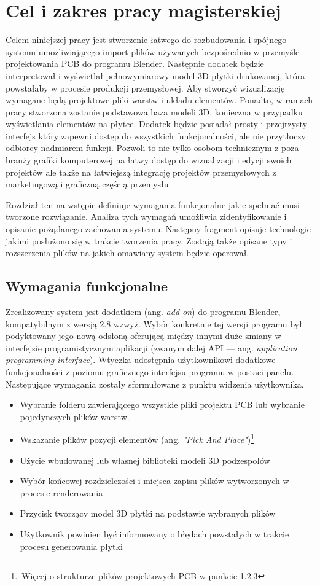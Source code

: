 \documentclass{xmgr}
\begin{document}
\chapter{Cel i zakres pracy magisterskiej}

Celem niniejszej pracy jest stworzenie łatwego do rozbudowania i spójnego systemu umożliwiającego import plików używanych bezpośrednio w przemyśle projektowania PCB do programu Blender. Następnie dodatek będzie interpretował i wyświetlał pełnowymiarowy model 3D płytki drukowanej, która powstałaby w procesie produkcji przemysłowej. Aby stworzyć wizualizację wymagane będą projektowe pliki warstw i układu elementów. Ponadto, w ramach pracy stworzona zostanie podstawowa baza modeli 3D, konieczna w przypadku wyświetlania elementów na płytce. Dodatek będzie posiadał prosty i przejrzysty interfejs który zapewni dostęp do wszystkich funkcjonalności, ale nie przytłoczy odbiorcy nadmiarem funkcji. Pozwoli to nie tylko osobom technicznym z poza branży grafiki komputerowej na łatwy dostęp do wizualizacji i edycji swoich projektów ale także na łatwiejszą integrację projektów przemysłowych z marketingową i graficzną częścią przemysłu.

Rozdział ten na wstępie definiuje wymagania funkcjonalne jakie spełniać musi tworzone rozwiązanie. Analiza tych wymagań umożliwia zidentyfikowanie i opisanie pożądanego zachowania systemu. Następny fragment opisuje technologie jakimi posłużono się w trakcie tworzenia pracy. Zostają także opisane typy i rozszerzenia plików na jakich omawiany system będzie operował.
\newpage

\section{Wymagania funkcjonalne}

Zrealizowany system jest dodatkiem (ang. \emph{add-on}) do programu Blender, kompatybilnym z wersją 2.8 wzwyż. Wybór konkretnie tej wersji programu był podyktowany jego nową odsłoną oferującą między innymi duże zmiany w interfejsie programistycznym aplikacji (zwanym dalej API --- ang. \emph{application programming interface}). Wtyczka udostępnia użytkownikowi dodatkowe funkcjonalności z poziomu graficznego interfejsu programu w postaci panelu. Następujące wymagania zostały sformułowane z punktu widzenia użytkownika.
\begin{itemize}
\item Wybranie folderu zawierającego wszystkie pliki projektu PCB lub wybranie pojedynczych plików warstw.
\item Wskazanie plików pozycji elementów (ang. \emph{"Pick And Place"})\footnote{\,Więcej o strukturze plików projektowych PCB w punkcie 1.2.3}
\item Użycie wbudowanej lub własnej biblioteki modeli 3D podzespołów
\item Wybór końcowej rozdzielczości i miejsca zapisu plików wytworzonych w procesie renderowania
\item Przycisk tworzący model 3D płytki na podstawie wybranych plików
\item Użytkownik powinien być informowany o błędach powstałych w trakcie procesu generowania płytki
\end{itemize}
\end{document}
